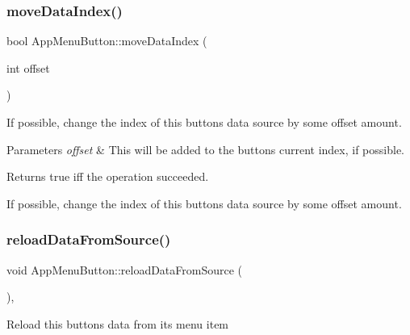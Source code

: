 \subsubsection{\texorpdfstring{move\+Data\+Index()}{moveDataIndex()}}
{\footnotesize\ttfamily bool App\+Menu\+Button\+::move\+Data\+Index (\begin{DoxyParamCaption}\item[{int}]{offset }\end{DoxyParamCaption})\hspace{0.3cm}{\ttfamily [virtual]}}

If possible, change the index of this button\textquotesingle{}s data source by some offset amount.


\begin{DoxyParams}{Parameters}
{\em offset} & This will be added to the button\textquotesingle{}s current index, if possible.\\
\hline
\end{DoxyParams}
\begin{DoxyReturn}{Returns}
true iff the operation succeeded.
\end{DoxyReturn}
If possible, change the index of this button\textquotesingle{}s data source by some offset amount. \mbox{\label{classAppMenuButton_ae25b2203f6d796af9ab7686d600f7f23}} 
\subsubsection{\texorpdfstring{reload\+Data\+From\+Source()}{reloadDataFromSource()}}
{\footnotesize\ttfamily void App\+Menu\+Button\+::reload\+Data\+From\+Source (\begin{DoxyParamCaption}{ }\end{DoxyParamCaption})\hspace{0.3cm}{\ttfamily [protected]}, {\ttfamily [virtual]}}

Reload this button\textquotesingle{}s data from its menu item \mbox{\label{classAppMenuButton_aabd4012101fc3f9d48ee816d5a1c5182}} 
